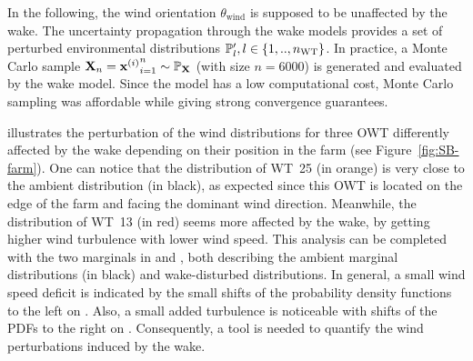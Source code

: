 In the following, the wind orientation $\theta_{\mathrm{wind}}$ is supposed to be unaffected by the wake. 
The uncertainty propagation through the wake models provides a set of perturbed environmental distributions $\P_l', l \in \left\{1,..,n_{\mathrm{WT}}\right\}$. 
In practice, a Monte Carlo sample $\bX_n={\bx^{(i)}}_{i=1}^n \sim \P_{\bX}$ (with size $n=6000$) is generated and evaluated by the wake model. 
Since the model has a low computational cost, Monte Carlo sampling was affordable while giving strong convergence guarantees. 

 illustrates the perturbation of the wind distributions for three OWT differently affected by the wake depending on their position in the farm (see Figure~\ref{fig:SB-farm}). 
One can notice that the distribution of WT~25 (in orange) is very close to the ambient distribution (in black), as expected since this OWT is located on the edge of the farm and facing the dominant wind direction. 
Meanwhile, the distribution of WT~13 (in red) seems more affected by the wake, by getting higher wind turbulence with lower wind speed. 
This analysis can be completed with the two marginals in  and , both describing the ambient marginal distributions (in black) and wake-disturbed distributions. 
In general, a small wind speed deficit is indicated by the small shifts of the probability density functions to the left on . 
Also, a small added turbulence is noticeable with shifts of the PDFs to the right on . 
Consequently, a tool is needed to quantify the wind perturbations induced by the wake.

